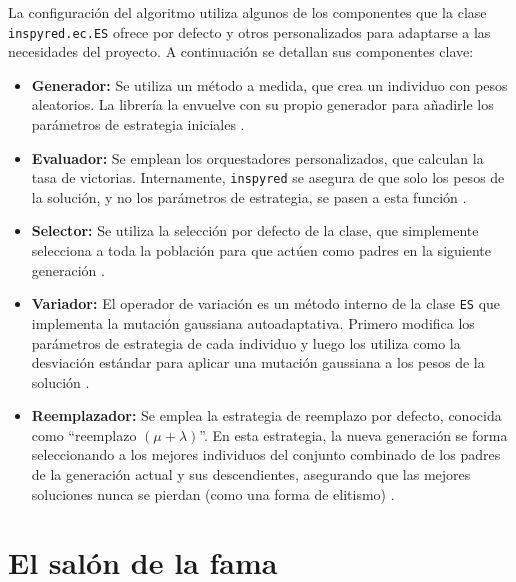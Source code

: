 La configuración del algoritmo utiliza algunos de los componentes que la clase \texttt{inspyred.ec.ES} ofrece por defecto y otros personalizados para adaptarse a las necesidades del proyecto. A continuación se detallan sus componentes clave:
\begin{itemize}
	\item \textbf{Generador:} Se utiliza un método a medida, que crea un individuo con pesos aleatorios. La librería la envuelve con su propio generador para añadirle los parámetros de estrategia iniciales \cite{aaron_garret_library_2025}.
	\item \textbf{Evaluador:} Se emplean los orquestadores personalizados, que calculan la tasa de victorias. Internamente, \texttt{inspyred} se asegura de que solo los pesos de la solución, y no los parámetros de estrategia, se pasen a esta función \cite{aaron_garret_library_2025}.
	\item \textbf{Selector:} Se utiliza la selección por defecto de la clase, que simplemente selecciona a toda la población para que actúen como padres en la siguiente generación \cite{aaron_garret_library_2025}.
	\item \textbf{Variador:} El operador de variación es un método interno de la clase \texttt{ES} que implementa la mutación gaussiana autoadaptativa. Primero modifica los parámetros de estrategia de cada individuo y luego los utiliza como la desviación estándar para aplicar una mutación gaussiana a los pesos de la solución \cite{aaron_garret_library_2025}.
	\item \textbf{Reemplazador:} Se emplea la estrategia de reemplazo por defecto, conocida como ``reemplazo $(\mu + \lambda)$''. En esta estrategia, la nueva generación se forma seleccionando a los mejores individuos del conjunto combinado de los padres de la generación actual y sus descendientes, asegurando que las mejores soluciones nunca se pierdan (como una forma de elitismo) \cite{aaron_garret_library_2025}.
\end{itemize}


\section{El salón de la fama} \label{sec:salon_fama}

